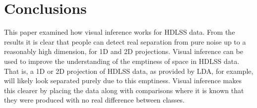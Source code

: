 %
% 
%
%


\section{Conclusions}

This paper examined how visual inference works for HDLSS data. From the results it is clear that people can detect real separation from pure noise  up to a reasonably high dimension, for 1D and 2D projections. Visual inference can be used to improve the understanding of the emptiness of space in HDLSS data. That is, a 1D or 2D projection of HDLSS data,  as provided by LDA, for example, will likely look separated purely due to this emptiness. Visual inference makes this clearer by placing the data along with comparisons where it is known that they were produced with no real difference between classes.


